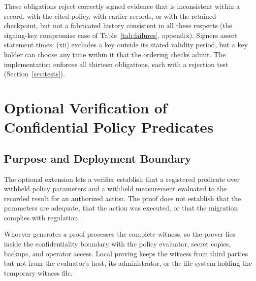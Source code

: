\documentclass[journal]{IEEEtran}
\begin{document}
These obligations reject correctly signed evidence that is inconsistent within a record, with the cited policy, with earlier records, or with the retained checkpoint, but not a fabricated history consistent in all these respects (the signing-key compromise case of Table~\ref{tab:failures}, appendix). Signers assert statement times: (xii) excludes a key outside its stated validity period, but a key holder can choose any time within it that the ordering checks admit. The implementation enforces all thirteen obligations, each with a rejection test (Section~\ref{sec:tests}).

\section{Optional Verification of Confidential Policy Predicates}
\label{sec:zk}

\subsection{Purpose and Deployment Boundary}
\label{sec:zkboundary}
The optional extension lets a verifier establish that a registered predicate over withheld policy parameters and a withheld measurement evaluated to the recorded result for an authorized action. The proof does not establish that the parameters are adequate, that the action was executed, or that the migration complies with regulation.

Whoever generates a proof processes the complete witness, so the prover lies inside the confidentiality boundary with the policy evaluator, secret copies, backups, and operator access. Local proving keeps the witness from third parties but not from the evaluator's host, its administrator, or the file system holding the temporary witness file.
\end{document}
